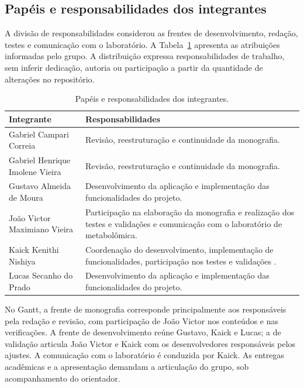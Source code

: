 \subsection{Papéis e responsabilidades dos integrantes}

A divisão de responsabilidades considerou as frentes de desenvolvimento, redação, testes e comunicação com o laboratório. A Tabela~\ref{tab:4-responsabilidades} apresenta as atribuições informadas pelo grupo. A distribuição expressa responsabilidades de trabalho, sem inferir dedicação, autoria ou participação a partir da quantidade de alterações no repositório.

\begin{table}[htbp]
\centering
\caption{Papéis e responsabilidades dos integrantes.}
\label{tab:4-responsabilidades}
\small
\begin{tabularx}{\textwidth}{|p{}|X|}
\hline
\textbf{Integrante} & \textbf{Responsabilidades} \\ \hline
Gabriel Campari Correia & Revisão, reestruturação e continuidade da monografia. \\ \hline
Gabriel Henrique Imolene Vieira & Revisão, reestruturação e continuidade da monografia. \\ \hline
Gustavo Almeida de Moura & Desenvolvimento da aplicação e implementação das funcionalidades do projeto. \\ \hline
João Victor Maximiano Vieira & Participação na elaboração da monografia e realização dos testes e validações e comunicação com o laboratório de metabolômica. \\ \hline
Kaick Kenithi Nishiya & Coordenação do desenvolvimento, implementação de funcionalidades, participação nos testes e validações . \\ \hline
Lucas Secanho do Prado & Desenvolvimento da aplicação e implementação das funcionalidades do projeto. \\ \hline
\end{tabularx}
\par{}
\end{table}

No Gantt, a frente de monografia corresponde principalmente aos responsáveis pela redação e revisão, com participação de João Victor nos conteúdos e nas verificações. A frente de desenvolvimento reúne Gustavo, Kaick e Lucas; a de validação articula João Victor e Kaick com os desenvolvedores responsáveis pelos ajustes. A comunicação com o laboratório é conduzida por Kaick. As entregas acadêmicas e a apresentação demandam a articulação do grupo, sob acompanhamento do orientador.

